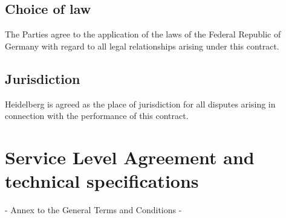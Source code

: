 \documentclass{terms}
\begin{document}
\subsection{Choice of law}
The Parties agree to the application of the laws of the Federal Republic of Germany with regard to all legal relationships arising under this contract.
\subsection{Jurisdiction}
Heidelberg is agreed as the place of jurisdiction for all disputes arising in connection with the performance of this contract.

\newpage
\section{Service Level Agreement and technical specifications}
\begin{center}
- Annex to the General Terms and Conditions -
\end{center}
\end{document}
